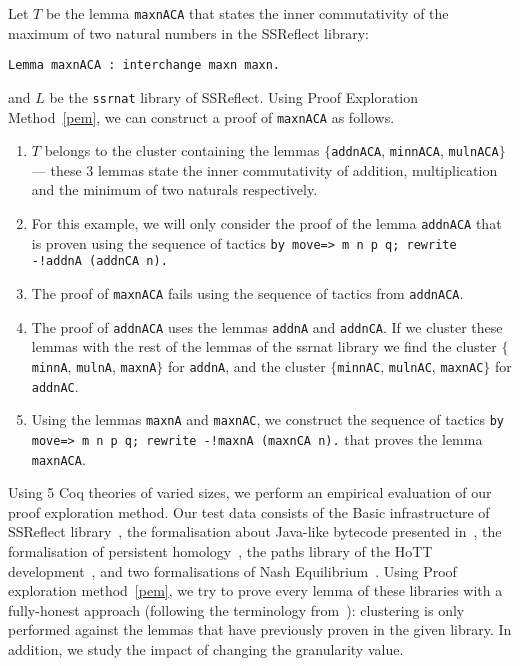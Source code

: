 \begin{example}\label{ex:maxnACA}
Let $T$ be the lemma \lstinline?maxnACA? that states the inner commutativity of the maximum of two natural numbers in the SSReflect library:

\begin{lstlisting}
Lemma maxnACA : interchange maxn maxn.
\end{lstlisting}

\noindent and $L$ be the \lstinline?ssrnat? library of SSReflect. Using Proof Exploration Method~\ref{pem}, we can construct a
proof of \lstinline?maxnACA? as follows.

\begin{enumerate}
 \item $T$ belongs to the cluster containing the lemmas $\{$\lstinline?addnACA?, \lstinline?minnACA?, \lstinline?mulnACA?$\}$ --- these
 3 lemmas state the inner commutativity of addition, multiplication and the minimum of two naturals respectively.
 \item For this example, we will only consider the proof of the lemma \lstinline?addnACA? that is proven using the sequence of tactics \lstinline?by move=> m n p q; rewrite -!addnA (addnCA n).?
 \item The proof of \lstinline?maxnACA? fails using the sequence of tactics from \lstinline?addnACA?.
 \item The proof of \lstinline?addnACA? uses the lemmas \lstinline?addnA? and \lstinline?addnCA?. If we cluster these lemmas with the
 rest of the lemmas of the ssrnat library we find the cluster $\{$\lstinline?minnA?, \lstinline?mulnA?, \lstinline?maxnA?$\}$ for
 \lstinline?addnA?, and the cluster $\{$\lstinline?minnAC?, \lstinline?mulnAC?, \lstinline?maxnAC?$\}$ for
 \lstinline?addnAC?.
 \item Using the lemmas \lstinline?maxnA? and \lstinline?maxnAC?, we construct the sequence of tactics \lstinline?by move=> m n p q; rewrite -!maxnA (maxnCA n).? that proves the lemma \lstinline?maxnACA?.
\end{enumerate}

\end{example}


Using 5 Coq theories of varied sizes, we perform an empirical evaluation of our proof exploration method. Our test data consists of the Basic infrastructure of SSReflect library~\cite{SSReflect}, the formalisation about Java-like bytecode presented in~\cite{HK14}, the formalisation of persistent homology~\cite{HCMS12}, the paths library of the HoTT development~\cite{hottbook}, and two formalisations of Nash Equilibrium~\cite{Ves06,nash}. Using Proof exploration method~\ref{pem}, we try to prove every lemma of these libraries with a fully-honest approach (following the terminology from~\cite{KaliszykU14}): clustering is only performed against the lemmas that have previously
proven in the given library. In addition, we study the impact of changing the granularity value.

